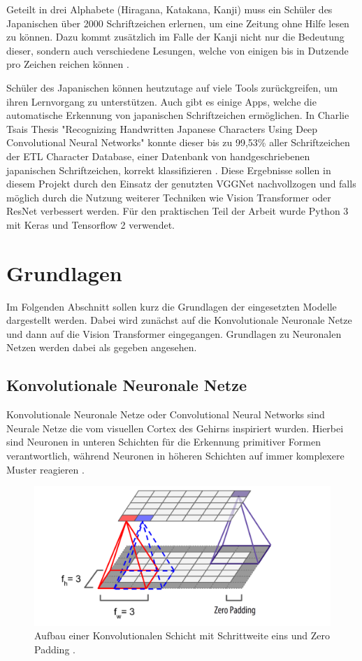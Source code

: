 \documentclass[twoside,a4paper]{IEEEtran}
\begin{document}
Geteilt in drei Alphabete (Hiragana, Katakana, Kanji) muss ein Schüler des Japanischen über 2000 Schriftzeichen erlernen, um eine Zeitung ohne Hilfe lesen zu können. Dazu kommt zusätzlich im Falle der Kanji nicht nur die Bedeutung dieser, sondern auch verschiedene Lesungen, welche von einigen bis in Dutzende pro Zeichen reichen können \cite{ABOUT_JAPANESE}.

Schüler des Japanischen können heutzutage auf viele Tools zurückgreifen, um ihren Lernvorgang zu unterstützen. Auch gibt es einige Apps, welche die automatische Erkennung von japanischen Schriftzeichen ermöglichen. In Charlie Tsais Thesis "Recognizing Handwritten Japanese Characters Using Deep Convolutional Neural Networks" konnte dieser bis zu 99,53\% aller Schriftzeichen der ETL Character Database, einer Datenbank von handgeschriebenen japanischen Schriftzeichen, korrekt klassifizieren \cite{RHC}. Diese Ergebnisse sollen in diesem Projekt durch den Einsatz der genutzten VGGNet nachvollzogen und falls möglich durch die Nutzung weiterer Techniken wie Vision Transformer oder ResNet verbessert werden. Für den praktischen Teil der Arbeit wurde Python 3 mit Keras und Tensorflow 2 verwendet.
\section{Grundlagen}
Im Folgenden Abschnitt sollen kurz die Grundlagen der eingesetzten Modelle dargestellt werden. Dabei wird zunächst auf die Konvolutionale Neuronale Netze und dann auf die Vision Transformer eingegangen. Grundlagen zu Neuronalen Netzen werden dabei als gegeben angesehen.
\subsection{Konvolutionale Neuronale Netze} %
Konvolutionale Neuronale Netze oder Convolutional Neural Networks sind Neurale Netze die vom visuellen Cortex des Gehirns inspiriert wurden. Hierbei sind Neuronen in unteren Schichten für die Erkennung primitiver Formen verantwortlich, während Neuronen in höheren Schichten auf immer komplexere Muster reagieren \cite[S.360]{MACHINE_LEARNING}. 
\begin{figure}[!htb]
	\includegraphics[width=\columnwidth]{cnn}
	\caption{Aufbau einer Konvolutionalen Schicht mit Schrittweite eins und Zero Padding \cite[S.362]{MACHINE_LEARNING}.}
	\label{bild1}
\end{figure}
\end{document}
